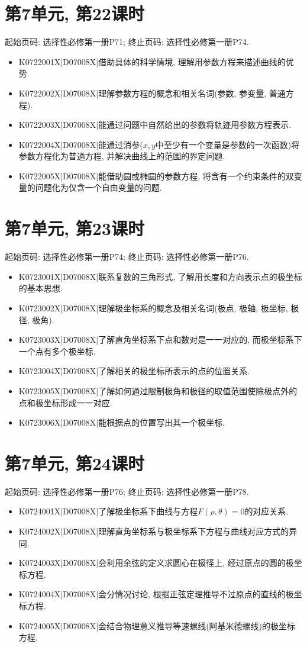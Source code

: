 \section*{第7单元, 第22课时}
起始页码: 选择性必修第一册P71; 终止页码: 选择性必修第一册P74.
\begin{itemize}
\item K0722001X|D07008X|借助具体的科学情境, 理解用参数方程来描述曲线的优势.
\item K0722002X|D07008X|理解参数方程的概念和相关名词(参数, 参变量, 普通方程).
\item K0722003X|D07008X|能通过问题中自然给出的参数将轨迹用参数方程表示.
\item K0722004X|D07008X|能通过消参($x,y$中至少有一个变量是参数的一次函数)将参数方程化为普通方程, 并解决曲线上的范围的界定问题.
\item K0722005X|D07008X|能借助圆或椭圆的参数方程, 将含有一个约束条件的双变量的问题化为仅含一个自由变量的问题.
\end{itemize}

\section*{第7单元, 第23课时}
起始页码: 选择性必修第一册P74; 终止页码: 选择性必修第一册P76.
\begin{itemize}
\item K0723001X|D07008X|联系复数的三角形式, 了解用长度和方向表示点的极坐标的基本思想.
\item K0723002X|D07008X|理解极坐标系的概念及相关名词(极点, 极轴, 极坐标, 极径, 极角).
\item K0723003X|D07008X|了解直角坐标系下点和数对是一一对应的, 而极坐标系下一个点有多个极坐标.
\item K0723004X|D07008X|了解相关的极坐标所表示的点的位置关系.
\item K0723005X|D07008X|了解如何通过限制极角和极径的取值范围使除极点外的点和极坐标形成一一对应.
\item K0723006X|D07008X|能根据点的位置写出其一个极坐标.
\end{itemize}

\section*{第7单元, 第24课时}
起始页码: 选择性必修第一册P76; 终止页码: 选择性必修第一册P78.
\begin{itemize}
\item K0724001X|D07008X|了解极坐标系下曲线与方程$F(\rho,\theta)=0$的对应关系.
\item K0724002X|D07008X|理解直角坐标系与极坐标系下方程与曲线对应方式的异同.
\item K0724003X|D07008X|会利用余弦的定义求圆心在极径上, 经过原点的圆的极坐标方程.
\item K0724004X|D07008X|会分情况讨论, 根据正弦定理推导不过原点的直线的极坐标方程.
\item K0724005X|D07008X|会结合物理意义推导等速螺线(阿基米德螺线)的极坐标方程.
\end{itemize}

